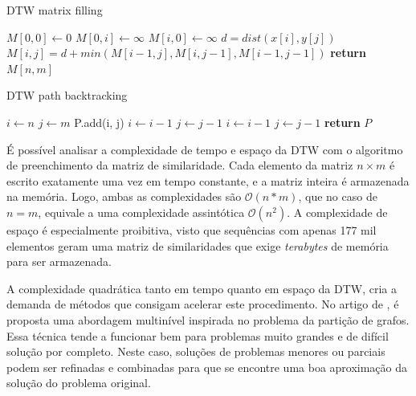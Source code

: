 \begin{algorithm}
\caption{DTW matrix filling}\label{dtw-matrix}
\begin{algorithmic}[1]
    \State $M[0, 0]\gets 0$
        \State $M[0, i] \gets \infty$
    \EndFor
        \State $M[i, 0] \gets \infty$
    \EndFor
            \State $d = dist(x[i], y[j])$
            \State $M[i, j] = d + min(M[i-1, j], M[i, j-1], M[i-1, j-1])$
        \EndFor
    \EndFor
\State \textbf{return} $M[n, m]$
\EndProcedure
\end{algorithmic}
\end{algorithm}

\begin{algorithm}
\caption{DTW path backtracking}\label{dtw-path}
\begin{algorithmic}[1]
    \State $i\gets n$
    \State $j\gets m$
        \State P.add(i, j)
            \State $i \gets i - 1$
            \State $j \gets j - 1$
            \State $i \gets i - 1$
        \Else
            \State $j \gets j - 1$
        \EndIf
    \EndWhile
\State \textbf{return} $P$
\EndProcedure
\end{algorithmic}
\end{algorithm}

É possível analisar a complexidade de tempo e espaço da DTW com o algoritmo de preenchimento da matriz de similaridade. Cada elemento da matriz $n \times m$ é escrito exatamente uma vez em tempo constante, e a matriz inteira é armazenada na memória. Logo, ambas as complexidades são $\mathcal{O}(n * m)$, que no caso de $n = m$, equivale a uma complexidade assintótica $\mathcal{O}(n^2)$. A complexidade de espaço é especialmente proibitiva, visto que sequências com apenas 177 mil elementos geram uma matriz de similaridades que exige \textit{terabytes} de memória para ser armazenada.

A complexidade quadrática tanto em tempo quanto em espaço da DTW, cria a demanda de métodos que consigam acelerar este procedimento. No artigo de \citet{salvador2007toward}, é proposta uma abordagem multinível inspirada no problema da partição de grafos. Essa técnica tende a funcionar bem para problemas muito grandes e de difícil solução por completo. Neste caso, soluções de problemas menores ou parciais podem ser refinadas e combinadas para que se encontre uma boa aproximação da solução do problema original.

